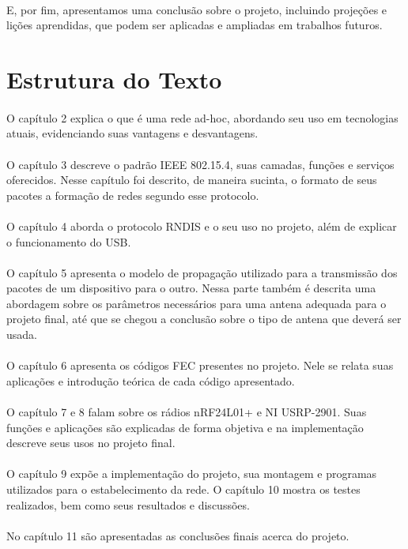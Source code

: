 \paragraph{} E, por fim, apresentamos uma conclusão sobre o projeto, incluindo projeções e lições aprendidas, que podem ser aplicadas e ampliadas em trabalhos futuros.
    
    
\section{Estrutura do Texto}
\paragraph{} O capítulo 2 explica o que é uma rede ad-hoc, abordando seu uso em tecnologias atuais, evidenciando suas vantagens e desvantagens. 

\paragraph{} O capítulo 3 descreve o padrão IEEE 802.15.4, suas camadas, funções e serviços oferecidos. Nesse capítulo foi descrito, de maneira sucinta, o formato de seus pacotes a formação de redes segundo esse protocolo.

\paragraph{} O capítulo 4 aborda o protocolo RNDIS e o seu uso no projeto, além de explicar o funcionamento do USB.

\paragraph{} O capítulo 5 apresenta o modelo de propagação utilizado para a transmissão dos pacotes de um dispositivo para o outro. Nessa parte também é descrita uma abordagem sobre os parâmetros necessários para uma antena adequada para o projeto final, até que se chegou a conclusão sobre o tipo de antena que deverá ser usada. 

\paragraph{} O capítulo 6 apresenta os códigos FEC presentes no projeto. Nele se relata suas aplicações e introdução teórica de cada código apresentado.  

\paragraph{} O capítulo 7 e 8 falam sobre os rádios nRF24L01+ e NI USRP-2901. Suas funções e aplicações são explicadas de forma objetiva e na implementação descreve seus usos no projeto final.

\paragraph{} O capítulo 9 expõe a implementação do projeto, sua montagem e programas utilizados para o estabelecimento da rede. O capítulo 10 mostra os testes realizados, bem como seus resultados e discussões.

\paragraph{} No capítulo 11 são apresentadas as conclusões finais acerca do projeto.